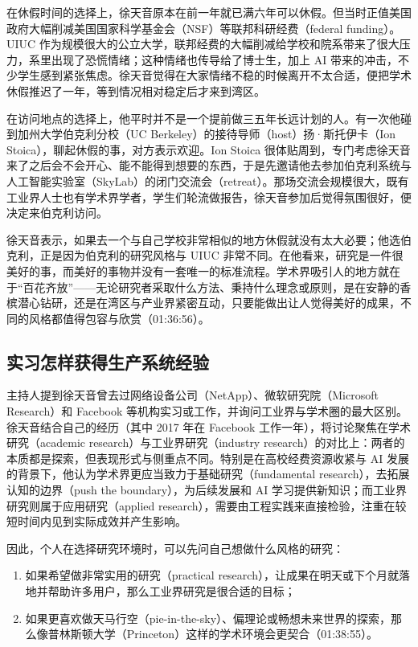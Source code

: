 \documentclass[UTF8,a4paper,11pt,fontset=fandol]{ctexart}
\begin{document}
在休假时间的选择上，徐天音原本在前一年就已满六年可以休假。但当时正值美国政府大幅削减美国国家科学基金会（NSF）等联邦科研经费（federal funding）。UIUC 作为规模很大的公立大学，联邦经费的大幅削减给学校和院系带来了很大压力，系里出现了恐慌情绪；这种情绪也传导给了博士生，加上 AI 带来的冲击，不少学生感到紧张焦虑。徐天音觉得在大家情绪不稳的时候离开不太合适，便把学术休假推迟了一年，等到情况相对稳定后才来到湾区。

在访问地点的选择上，他平时并不是一个提前做三五年长远计划的人。有一次他碰到加州大学伯克利分校（UC Berkeley）的接待导师（host）扬·斯托伊卡（Ion Stoica），聊起休假的事，对方表示欢迎。Ion Stoica 很体贴周到，专门考虑徐天音来了之后会不会开心、能不能得到想要的东西，于是先邀请他去参加伯克利系统与人工智能实验室（SkyLab）的闭门交流会（retreat）。那场交流会规模很大，既有工业界人士也有学术界学者，学生们轮流做报告，徐天音参加后觉得氛围很好，便决定来伯克利访问。

徐天音表示，如果去一个与自己学校非常相似的地方休假就没有太大必要；他选伯克利，正是因为伯克利的研究风格与 UIUC 非常不同。在他看来，研究是一件很美好的事，而美好的事物并没有一套唯一的标准流程。学术界吸引人的地方就在于“百花齐放”——无论研究者采取什么方法、秉持什么理念或原则，是在安静的香槟潜心钻研，还是在湾区与产业界紧密互动，只要能做出让人觉得美好的成果，不同的风格都值得包容与欣赏（01:36:56）。

\subsection{实习怎样获得生产系统经验}
主持人提到徐天音曾去过网络设备公司（NetApp）、微软研究院（Microsoft Research）和 Facebook 等机构实习或工作，并询问工业界与学术圈的最大区别。徐天音结合自己的经历（其中 2017 年在 Facebook 工作一年），将讨论聚焦在学术研究（academic research）与工业界研究（industry research）的对比上：两者的本质都是探索，但表现形式与侧重点不同。特别是在高校经费资源收紧与 AI 发展的背景下，他认为学术界更应当致力于基础研究（fundamental research），去拓展认知的边界（push the boundary），为后续发展和 AI 学习提供新知识；而工业界研究则属于应用研究（applied research），需要由工程实践来直接检验，注重在较短时间内见到实际成效并产生影响。

因此，个人在选择研究环境时，可以先问自己想做什么风格的研究：
\begin{enumerate}
\item 如果希望做非常实用的研究（practical research），让成果在明天或下个月就落地并帮助许多用户，那么工业界研究是很合适的目标；
\item 如果更喜欢做天马行空（pie-in-the-sky）、偏理论或畅想未来世界的探索，那么像普林斯顿大学（Princeton）这样的学术环境会更契合（01:38:55）。
\end{enumerate}
\end{document}
